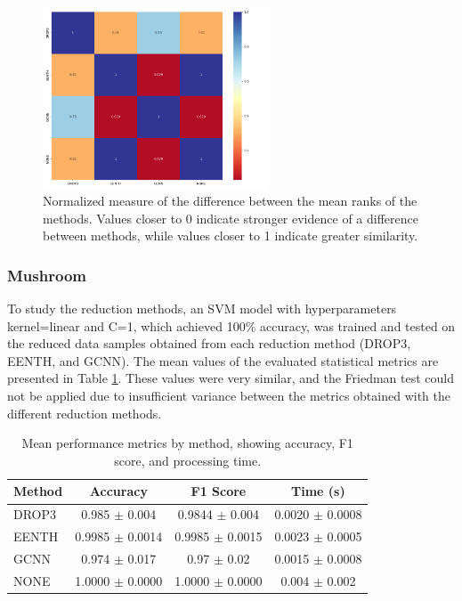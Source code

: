 \begin{figure}[H]
    \centering
    \includegraphics[width=0.6\textwidth]{figures/svm/hepatitis/svm_results_heatmap.png}
    \caption{Normalized measure of the difference between the mean ranks of the methods. Values closer to 0 indicate stronger evidence of a difference between methods, while values closer to 1 indicate greater similarity.}
    \label{fig:hep_svm_red}
\end{figure}

\subsubsection{Mushroom}

To study the reduction methods, an SVM model with hyperparameters kernel=linear and C=1, which achieved 100$\%$ accuracy, was trained and tested on the reduced data samples obtained from each reduction method (DROP3, EENTH, and GCNN). The mean values of the evaluated statistical metrics are presented in Table \ref{tab:method_metrics_m}. These values were very similar, and the Friedman test could not be applied due to insufficient variance between the metrics obtained with the different reduction methods.

\begin{table}[h!]
\centering
\begin{tabular}{|l|c|c|c|}
\hline
\textbf{Method} & \textbf{Accuracy} & \textbf{F1 Score} & \textbf{Time (s)} \\
\hline
DROP3 & 0.985 $\pm$ 0.004 & 0.9844 $\pm$ 0.004 & 0.0020 $\pm$ 0.0008 \\
\hline
EENTH & 0.9985 $\pm$ 0.0014 & 0.9985 $\pm$ 0.0015 & 0.0023 $\pm$ 0.0005 \\
\hline
GCNN  & 0.974 $\pm$ 0.017 & 0.97 $\pm$ 0.02 & 0.0015 $\pm$ 0.0008 \\
\hline
NONE  & 1.0000 $\pm$ 0.0000 & 1.0000 $\pm$ 0.0000 & 0.004 $\pm$ 0.002 \\
\hline
\end{tabular}
\caption{Mean performance metrics by method, showing accuracy, F1 score, and processing time.}
\label{tab:method_metrics_m}
\end{table}


